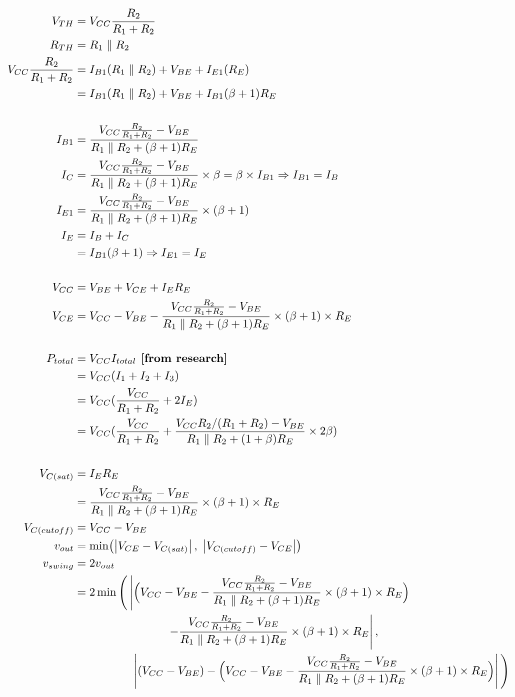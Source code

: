 \documentclass[11pt, a4paper]{article}
\begin{document}
\begin{align*}
    V_{TH} &= V_{CC} \frac{R_2}{R_1+R_2} \\
    R_{TH} &= R_1 \parallel R_2\\
    V_{CC} \frac{R_2}{R_1+R_2} &= I_{B1} (R_1 \parallel R_2) + V_{BE} + I_{E1} (R_E)\\
    & = I_{B1} (R_1 \parallel R_2) + V_{BE} + I_{B1}(\beta+1)R_E\\ \\
    I_{B1} &= \frac{V_{CC}\frac{R_2}{R_1+R_2}-V_{BE}}{R_1 \parallel R_2 + (\beta+1)R_E}\\
    I_{C} &= \frac{V_{CC}\frac{R_2}{R_1+R_2}-V_{BE}}{R_1 \parallel R_2 + (\beta+1)R_E} \times \beta = \beta \times I_{B1} \Rightarrow I_{B1} = I_B\\
    I_{E1} &= \frac{V_{CC}\frac{R_2}{R_1+R_2}-V_{BE}}{R_1 \parallel R_2 + (\beta+1)R_E} \times (\beta + 1)\\
    I_{E} &= I_B + I_C\\
     &= I_{B1}(\beta + 1) \Rightarrow I_{E1} = I_E \\ \\
     V_{CC} &= V_{BE} + V_{CE} + I_E R_E\\
     V_{CE} &= V_{CC} - V_{BE} - \frac{V_{CC}\frac{R_2}{R_1+R_2}-V_{BE}}{R_1 \parallel R_2 + (\beta+1)R_E} \times (\beta + 1) \times R_E\\ \\
    P_{total} &= V_{CC} I_{total} \textbf{ [from research]}\\
    &= V_{CC} (I_1 + I_2 + I_3)\\ 
    & = V_{CC} (\frac{V_{CC}}{R_1 + R_2} + 2I_E)\\
    & = V_{CC} (\frac{V_{CC}}{R_1 + R_2} + \frac{V_{CC}R_2/(R_1+R_2)-V_{BE}}{R_1 \parallel R_2 + (1+\beta)R_E} \times 2\beta)\\ \\
V_{C(sat)} &= I_E R_E\\
 &= \frac{V_{CC}\frac{R_2}{R_1+R_2}-V_{BE}}{R_1 \parallel R_2 + (\beta+1)R_E} \times (\beta + 1) \times R_E\\
 V_{C(cutoff)} &= V_{CC} - V_{BE}\\
 v_{out} &= \min\!\left(\left|V_{CE} - V_{C(sat)}\right|,\; \left|V_{C(cutoff)} - V_{CE}\right|\right)\\
 v_{swing} &= 2v_{out}\\
 &= 2\min\Bigg(
 \left|\vphantom{\frac{A}{B}}
     \Big(V_{CC} - V_{BE}
     - \frac{V_{CC}\frac{R_2}{R_1+R_2}-V_{BE}}{R_1 \parallel R_2 + (\beta+1)R_E}
     \times (\beta + 1) \times R_E\Big)\right.\\
 &\qquad\qquad\qquad\qquad
     \left.- \frac{V_{CC}\frac{R_2}{R_1+R_2}-V_{BE}}{R_1 \parallel R_2 + (\beta+1)R_E}
     \times (\beta + 1) \times R_E\right|, \\
 &\qquad\qquad\quad \left|(V_{CC} - V_{BE})
     - \Big(V_{CC} - V_{BE}
     - \frac{V_{CC}\frac{R_2}{R_1+R_2}-V_{BE}}{R_1 \parallel R_2 + (\beta+1)R_E}
     \times (\beta + 1) \times R_E\Big)\right|
 \Bigg)
\end{align*}
\end{document}

